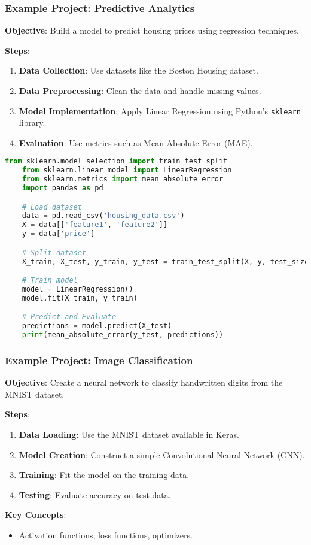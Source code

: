 \documentclass{beamer}
\begin{document}
\begin{frame}[fragile]
    \frametitle{Example Project: Predictive Analytics}
    \textbf{Objective}:
    Build a model to predict housing prices using regression techniques.

    \textbf{Steps}:
    \begin{enumerate}
        \item \textbf{Data Collection}: Use datasets like the Boston Housing dataset.
        \item \textbf{Data Preprocessing}: Clean the data and handle missing values.
        \item \textbf{Model Implementation}: Apply Linear Regression using Python's \texttt{sklearn} library.
        \item \textbf{Evaluation}: Use metrics such as Mean Absolute Error (MAE).
    \end{enumerate}
    
    \begin{lstlisting}[language=Python]
    from sklearn.model_selection import train_test_split
    from sklearn.linear_model import LinearRegression
    from sklearn.metrics import mean_absolute_error
    import pandas as pd

    # Load dataset
    data = pd.read_csv('housing_data.csv')
    X = data[['feature1', 'feature2']]
    y = data['price']

    # Split dataset
    X_train, X_test, y_train, y_test = train_test_split(X, y, test_size=0.2)

    # Train model
    model = LinearRegression()
    model.fit(X_train, y_train)

    # Predict and Evaluate
    predictions = model.predict(X_test)
    print(mean_absolute_error(y_test, predictions))
    \end{lstlisting}
\end{frame}

\begin{frame}
    \frametitle{Example Project: Image Classification}
    \textbf{Objective}:
    Create a neural network to classify handwritten digits from the MNIST dataset.

    \textbf{Steps}:
    \begin{enumerate}
        \item \textbf{Data Loading}: Use the MNIST dataset available in Keras.
        \item \textbf{Model Creation}: Construct a simple Convolutional Neural Network (CNN).
        \item \textbf{Training}: Fit the model on the training data.
        \item \textbf{Testing}: Evaluate accuracy on test data.
    \end{enumerate}
    
    \textbf{Key Concepts}:
    \begin{itemize}
        \item Activation functions, loss functions, optimizers.
    \end{itemize}
\end{frame}
\end{document}
